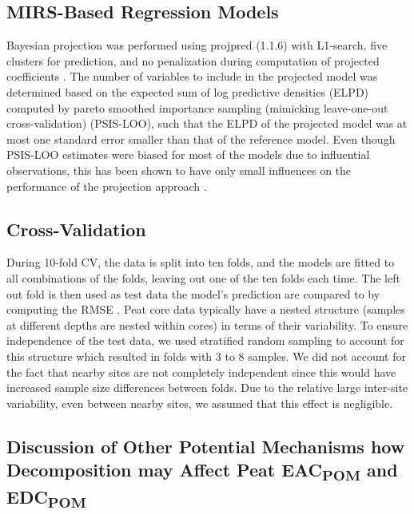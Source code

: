 \documentclass[alpha-refs, lineno]{wiley-article-rmd}
\begin{document}
\hypertarget{mirs-based-regression-models}{%
\subsection{MIRS-Based Regression Models}\label{mirs-based-regression-models}}

Bayesian projection was performed using projpred (1.1.6) \autocite{Piironen.2019} with L1-search, five clusters for prediction, and no penalization during computation of projected coefficients \autocite{Piironen.2019,Piironen.2020}. The number of variables to include in the projected model was determined based on the expected sum of log predictive densities (ELPD) computed by pareto smoothed importance sampling (mimicking leave-one-out cross-validation) (PSIS-LOO), such that the ELPD of the projected model was at most one standard error smaller than that of the reference model. Even though PSIS-LOO estimates were biased for most of the models due to influential observations, this has been shown to have only small influences on the performance of the projection approach \autocite{Piironen.2020}.

\hypertarget{cross-validation}{%
\subsection{Cross-Validation}\label{cross-validation}}

During 10-fold CV, the data is split into ten folds, and the models are fitted to all combinations of the folds, leaving out one of the ten folds each time. The left out fold is then used as test data the model's prediction are compared to by computing the RMSE \autocite{Roberts.2017}. Peat core data typically have a nested structure (samples at different depths are nested within cores) in terms of their variability. To ensure independence of the test data, we used stratified random sampling to account for this structure \autocite{Roberts.2017} which resulted in folds with 3 to 8 samples. We did not account for the fact that nearby sites are not completely independent since this would have increased sample size differences between folds. Due to the relative large inter-site variability, even between nearby sites, we assumed that this effect is negligible.

\hypertarget{discussion-of-other-potential-mechanisms-how-decomposition-may-affect-peat-eac-and-edc}{%
\subsection{\texorpdfstring{Discussion of Other Potential Mechanisms how Decomposition may Affect Peat EAC\textsubscript{POM} and EDC\textsubscript{POM}}{Discussion of Other Potential Mechanisms how Decomposition may Affect Peat EAC and EDC}}\label{discussion-of-other-potential-mechanisms-how-decomposition-may-affect-peat-eac-and-edc}}
\end{document}
